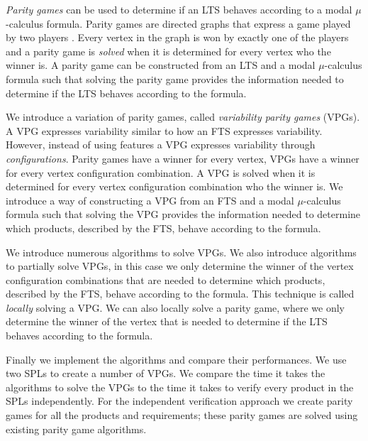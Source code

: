 \textit{Parity games} can be used to determine if an LTS behaves according to a modal $\mu$-calculus formula. Parity games are directed graphs that express a game played by two players \cite{Bradfield2018}. Every vertex in the graph is won by exactly one of the players and a parity game is \textit{solved} when it is determined for every vertex who the winner is. A parity game can be constructed from an LTS and a modal $\mu$-calculus formula such that solving the parity game provides the information needed to determine if the LTS behaves according to the formula.

We introduce a variation of parity games, called \textit{variability parity games} (VPGs). A VPG expresses variability similar to how an FTS expresses variability. However, instead of using features a VPG expresses variability through \textit{configurations}. Parity games have a winner for every vertex, VPGs have a winner for every vertex configuration combination. A VPG is solved when it is determined for every vertex configuration combination who the winner is. We introduce a way of constructing a VPG from an FTS and a modal $\mu$-calculus formula such that solving the VPG provides the information needed to determine which products, described by the FTS, behave according to the formula.

We introduce numerous algorithms to solve VPGs. We also introduce algorithms to partially solve VPGs, in this case we only determine the winner of the vertex configuration combinations that are needed to determine which products, described by the FTS, behave according to the formula. This technique is called \textit{locally} solving a VPG. We can also locally solve a parity game, where we only determine the winner of the vertex that is needed to determine if the LTS behaves according to the formula.

Finally we implement the algorithms and compare their performances. We use two SPLs to create a number of VPGs. We compare the time it takes the algorithms to solve the VPGs to the time it takes to verify every product in the SPLs independently. For the independent verification approach we create parity games for all the products and requirements; these parity games are solved using existing parity game algorithms.